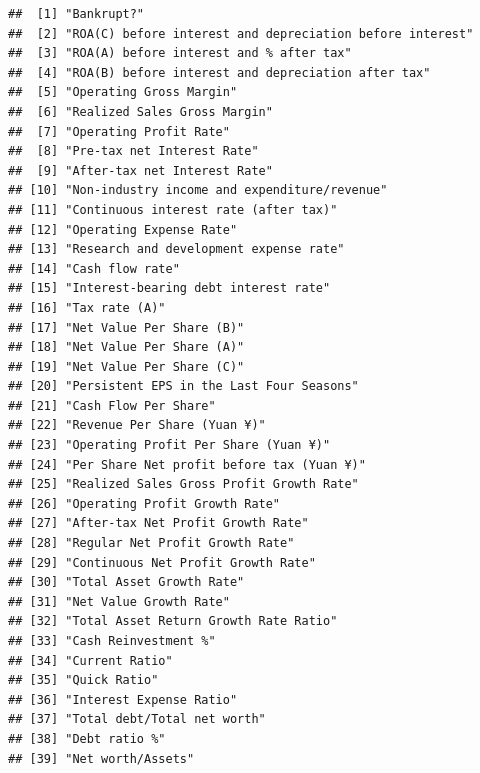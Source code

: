 \documentclass[
]{book}
\begin{document}
\begin{verbatim}
##  [1] "Bankrupt?"                                              
##  [2] "ROA(C) before interest and depreciation before interest"
##  [3] "ROA(A) before interest and % after tax"                 
##  [4] "ROA(B) before interest and depreciation after tax"      
##  [5] "Operating Gross Margin"                                 
##  [6] "Realized Sales Gross Margin"                            
##  [7] "Operating Profit Rate"                                  
##  [8] "Pre-tax net Interest Rate"                              
##  [9] "After-tax net Interest Rate"                            
## [10] "Non-industry income and expenditure/revenue"            
## [11] "Continuous interest rate (after tax)"                   
## [12] "Operating Expense Rate"                                 
## [13] "Research and development expense rate"                  
## [14] "Cash flow rate"                                         
## [15] "Interest-bearing debt interest rate"                    
## [16] "Tax rate (A)"                                           
## [17] "Net Value Per Share (B)"                                
## [18] "Net Value Per Share (A)"                                
## [19] "Net Value Per Share (C)"                                
## [20] "Persistent EPS in the Last Four Seasons"                
## [21] "Cash Flow Per Share"                                    
## [22] "Revenue Per Share (Yuan ¥)"                             
## [23] "Operating Profit Per Share (Yuan ¥)"                    
## [24] "Per Share Net profit before tax (Yuan ¥)"               
## [25] "Realized Sales Gross Profit Growth Rate"                
## [26] "Operating Profit Growth Rate"                           
## [27] "After-tax Net Profit Growth Rate"                       
## [28] "Regular Net Profit Growth Rate"                         
## [29] "Continuous Net Profit Growth Rate"                      
## [30] "Total Asset Growth Rate"                                
## [31] "Net Value Growth Rate"                                  
## [32] "Total Asset Return Growth Rate Ratio"                   
## [33] "Cash Reinvestment %"                                    
## [34] "Current Ratio"                                          
## [35] "Quick Ratio"                                            
## [36] "Interest Expense Ratio"                                 
## [37] "Total debt/Total net worth"                             
## [38] "Debt ratio %"                                           
## [39] "Net worth/Assets"                                       

\end{verbatim}
\end{document}
